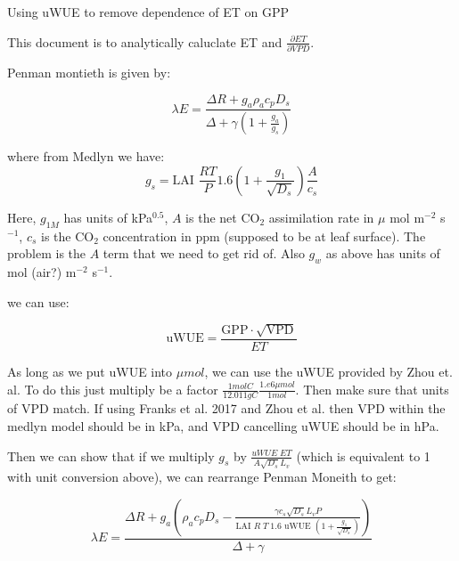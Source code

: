 
\usepackage{graphics, graphicx}
\graphicspath{ {./} } %


\begin{center}
\large{Using uWUE to remove dependence of ET on GPP}\end{center}

\bigskip

This document is to analytically caluclate ET and $\frac{\partial ET} {\partial VPD}$.

Penman montieth is given by:

\begin{equation}
  \lambda E = \frac{\Delta R + g_a \rho_a c_p D_{s}}{\Delta + \gamma(1 + \frac{g_a}{g_s})}
\end{equation}

where from Medlyn we have:
\begin{equation}
  g_s = \text{LAI } \frac{R T}{P} 1.6 \left(1 + \frac{g_1}{\sqrt{D_{s}}}\right) \frac{A}{c_s}
\end{equation}

Here, $g_{1M}$ has units of kPa$^{0.5}$, $A$ is the net CO$_2$ assimilation rate in $\mu$ mol m$^{-2}$ s$^{-1}$, $c_s$ is the CO$_2$ concentration in ppm (supposed to be at leaf surface). The problem is the $A$ term that we need to get rid of. Also $g_w$ as above has units of mol (air?) m$^{-2}$ s$^{-1}$. 

we can use:

\begin{equation}
  \text{uWUE} = \frac{\text{GPP} \cdot \sqrt{\text{VPD}}}{ET}
\end{equation}

As long as we put uWUE into $\mu mol$, we can use the uWUE provided by Zhou et. al. To do this just multiply be a factor $ \frac{1 mol C}{12.011 g C} \frac{1.e6 \mu mol}{1 mol}$. Then make sure that units of VPD match. If using Franks et al. 2017 and Zhou et al. then VPD within the medlyn model should be in kPa, and VPD cancelling uWUE should be in hPa.

Then we can show that if we multiply $g_s$ by $\frac{ uWUE \; ET}{A \sqrt{D_s} L_v}$ (which is equivalent to 1 with unit conversion above), we can rearrange Penman Moneith to get:

\begin{equation}
  \lambda E = \frac{\Delta R + g_a \left( \rho_a c_p D_{s} - \frac{\gamma c_s \sqrt{D_s} L_v P }{\text{LAI } R \; T \; 1.6 \text{ uWUE } (1 + \frac{g_1}{\sqrt{D_s}})} \right) }{ \Delta + \gamma}
\end{equation}

